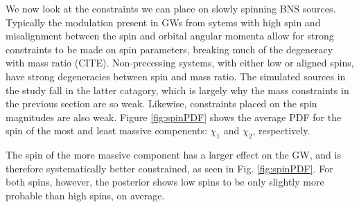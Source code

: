 We now look at the constraints we can place on slowly spinning BNS sources.  Typically the modulation present in GWs from sytems with high spin and misalignment between the spin and orbital angular momenta allow for strong constraints to be made on spin parameters, breaking much of the degeneracy with mass ratio (CITE).  Non-precessing systems, with either low or aligned spins, have strong degeneracies between spin and mass ratio.  The simulated sources in the study fall in the latter catagory, which is largely why the mass constraints in the previous section are so weak.  Likewise, constraints placed on the spin magnitudes are also weak.  Figure \ref{fig:spinPDF} shows the average PDF for the spin of the most and least massive compenents: $\chi_1$ and $\chi_2$, respectively.

The spin of the more massive component has a larger effect on the GW, and is therefore systematically better constrained, as seen in Fig. \ref{fig:spinPDF}.  For both spins, however, the posterior shows low spins to be only slightly more probable than high spins, on average.